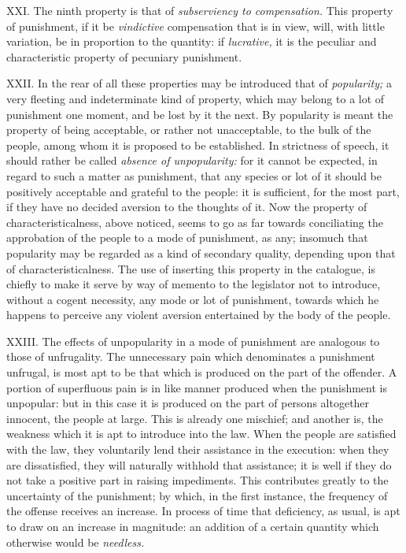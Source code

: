 \documentclass[12pt]{report}
\begin{document}
XXI. The ninth property is that of \emph{subserviency to compensation.}
This property of punishment, if it be \emph{vindictive} compensation
that is in view, will, with little variation, be in proportion to the
quantity: if \emph{lucrative,} it is the peculiar and characteristic
property of pecuniary punishment.

XXII. In the rear of all these properties may be introduced that of
\emph{popularity;} a very fleeting and indeterminate kind of property,
which may belong to a lot of punishment one moment, and be lost by it
the next. By popularity is meant the property of being acceptable, or
rather not unacceptable, to the bulk of the people, among whom it is
proposed to be established. In strictness of speech, it should rather be
called \emph{absence of unpopularity:} for it cannot be expected, in
regard to such a matter as punishment, that any species or lot of it
should be positively acceptable and grateful to the people: it is
sufficient, for the most part, if they have no decided aversion to the
thoughts of it. Now the property of characteristicalness, above noticed,
seems to go as far towards conciliating the approbation of the people to
a mode of punishment, as any; insomuch that popularity may be regarded
as a kind of secondary quality, depending upon that of
characteristicalness. The use of inserting this property in the
catalogue, is chiefly to make it serve by way of memento to the
legislator not to introduce, without a cogent necessity, any mode or lot
of punishment, towards which he happens to perceive any violent aversion
entertained by the body of the people.

XXIII. The effects of unpopularity in a mode of punishment are analogous
to those of unfrugality. The unnecessary pain which denominates a
punishment unfrugal, is most apt to be that which is produced on the
part of the offender. A portion of superfluous pain is in like manner
produced when the punishment is unpopular: but in this case it is
produced on the part of persons altogether innocent, the people at
large. This is already one mischief; and another is, the weakness which
it is apt to introduce into the law. When the people are satisfied with
the law, they voluntarily lend their assistance in the execution: when
they are dissatisfied, they will naturally withhold that assistance; it
is well if they do not take a positive part in raising impediments. This
contributes greatly to the uncertainty of the punishment; by which, in
the first instance, the frequency of the offense receives an increase.
In process of time that deficiency, as usual, is apt to draw on an
increase in magnitude: an addition of a certain quantity which otherwise
would be \emph{needless.}
\end{document}
